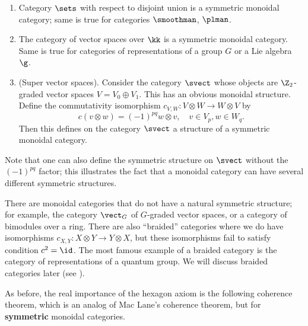 \begin{example}\par\noindent
  \begin{enumerate}
    \item Category $\sets$ with respect to disjoint union is a
      symmetric monoidal category; same is true for categories
      $\smoothman$, $\plman$.
    \item
      The category of vector spaces over $\kk$ is a symmetric monoidal category.
      Same is true for categories of representations of a group $G$ or
      a Lie algebra $\g$.
    \item (Super vector spaces). Consider the category $\svect$ whose
      objects are $\Z_2$-graded vector spaces $V=V_0\oplus V_1$. This
      has an obvious monoidal structure.
      Define the commutativity isomorphism $c_{V,W}\colon V\otimes W
      \to W\otimes V$ by
      $$
      c(v\otimes w)=(-1)^{pq} w\otimes v, \quad v\in V_p, w\in W_q.
      $$
      Then this defines on the category $\svect$ a structure of a
      symmetric monoidal category.
  \end{enumerate}
\end{example}
Note that one can also define the symmetric structure on $\svect$ without the
$(-1)^{pq}$ factor; this illustrates the fact that a monoidal category can have
several different symmetric structures.
\begin{remark}
  There are monoidal categories that do not have a natural symmetric structure;
  for example, the category $\vect_G$ of $G$-graded vector spaces, or a
  category
  of bimodules over a ring. There are also ``braided'' categories where we do
  have isomorphisms $c_{X,Y}\colon X\otimes Y \to Y\otimes X$, but these
  isomorphisms fail to satisfy condition $c^2=\id$. The  most famous example of
  a braided  category  is the category of representations of a quantum group. We
  will discuss braided categories later (see ).
\end{remark}

As before, the real importance of the hexagon axiom is the following coherence
theorem, which is an analog of Mac Lane's coherence theorem, but for
\textbf{symmetric} monoidal categories.

